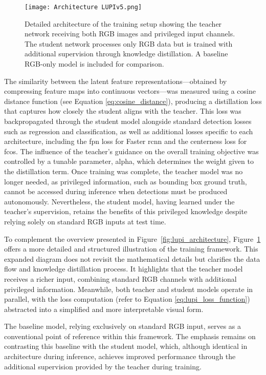 \begin{figure}[ht]
\centering
\texttt{[image: Architecture LUPIv5.png]}
\caption{Detailed architecture of the training setup showing the teacher network receiving both RGB images and privileged input channels. The student network processes only RGB data but is trained with additional supervision through knowledge distillation. A baseline RGB-only model is included for comparison.}
\label{fig:lupi_architecture_final}
\end{figure}

The similarity between the latent feature representations—obtained by compressing feature maps into continuous vectors—was measured using a cosine distance function (see Equation \ref{eq:cosine_distance}), producing a distillation loss that captures how closely the student aligns with the teacher. This loss was backpropagated through the student model alongside standard detection losses such as regression and classification, as well as additional losses specific to each architecture, including the \gls{fpn} loss for Faster \gls{rcnn} and the centerness loss for \gls{fcos}. The influence of the teacher’s guidance on the overall training objective was controlled by a tunable parameter, \gls{alpha}, which determines the weight given to the distillation term. Once training was complete, the teacher model was no longer needed, as privileged information, such as bounding box ground truth, cannot be accessed during inference when detections must be produced autonomously. Nevertheless, the student model, having learned under the teacher’s supervision, retains the benefits of this privileged knowledge despite relying solely on standard RGB inputs at test time.


To complement the overview presented in Figure~\ref{fig:lupi_architecture}, Figure~\ref{fig:lupi_architecture_final} offers a more detailed and structured illustration of the training framework. This expanded diagram does not revisit the mathematical details but clarifies the data flow and knowledge distillation process. It highlights that the teacher model receives a richer input, combining standard RGB channels with additional privileged information. Meanwhile, both teacher and student models operate in parallel, with the loss computation (refer to Equation \ref{eq:lupi_loss_function}) abstracted into a simplified and more interpretable visual form.

The baseline model, relying exclusively on standard RGB input, serves as a conventional point of reference within this framework. The emphasis remains on contrasting this baseline with the student model, which, although identical in architecture during inference, achieves improved performance through the additional supervision provided by the teacher during training.


